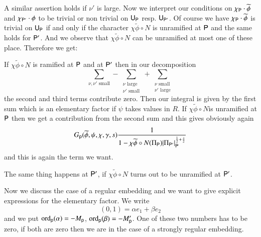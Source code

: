 A similar assertion holds if $\nu'$ is large. Now we interpret our conditions on $\chi_{\mathsf{P}}\cdot \widetilde{\phi}$ and $\chi_{\mathsf{P}'}\cdot \phi$ to be trivial or non trivial on $\mathsf{U}_{\mathsf{P}}$ resp. $\mathsf{U}_{\mathsf{P}'}$. Of course we have $\chi_{\mathsf{P}}\cdot \widetilde{\phi}$ is trivial on $\mathsf{U}_{\mathsf{P}}$ if and only if the character $\chi\widetilde{\phi}\circ N$ is unramified at $\mathsf{P}$ and the same holds for $\mathsf{P}'$. And we observe that $\chi\widetilde{\phi}\circ N$ can be unramified at most one of these place. Therefore we get:

If $\chi\widetilde{\phi}\circ N$ is ramified at $\mathsf{P}$ and at $\mathsf{P}'$ then in our decomposition
$$
\sum\limits_{\nu,\nu'\text{~small}}-\sum\limits_{\substack{\nu\text{~large}\\ \nu'\text{~small}}}+\sum\limits_{\substack{\nu\text{~small}\\ \nu'\text{~large}}}
$$
the second and third terms contribute zero. Then our integral is given by the first sum which is an elementary factor if $\psi$ takes values in $R$. If $\chi\widetilde{\phi}\circ N$\pageoriginale is unramified at $\mathsf{P}$ then we get a contribution from the second sum and this gives obviously again
$$
G_{\mathsf{p}}(\widetilde{\phi},\psi,\chi,\gamma,s)\frac{1}{1-\chi\widetilde{\phi}\circ N(\Pi_{\mathsf{P}})|\Pi_{\mathsf{P}'}|^{\frac{1}{2}+\frac{s}{2}}_{\mathsf{P}}}
$$
and this is again the term we want.

The same thing happens at $\mathsf{P}'$, if $\chi\widetilde{\phi}\circ N$ turns out to be unramified at $\mathsf{P}'$.

Now we discuss the case of a regular embedding and we want to give explicit expressions for the elementary factor. We write
$$
(0,1)=\alpha e_{1}+\beta e_{2}
$$
and we put $\operatorname{ord}_{\mathsf{p}}(\alpha)=-M_{\mathsf{p}}$, $\operatorname{ord}_{\mathsf{p}}(\beta)=-M'_{\mathsf{p}}$. One of these two numbers has to be zero, if both are zero then we are in the case of a strongly regular embedding.

